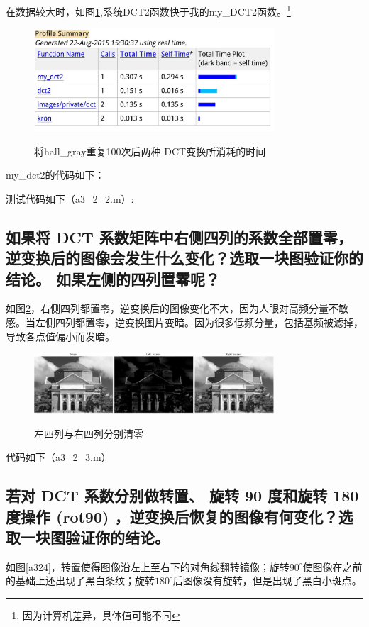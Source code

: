 \documentclass{ctexart}
\begin{document}
在数据较大时，如图\ref{a322},系统DCT2函数快于我的my\_DCT2函数。\footnote{因为计算机差异，具体值可能不同}
\begin{figure}
    \centering
    \includegraphics[width=0.8\textwidth]{a3_2_2.jpg}\\
    \caption{将hall\_gray重复100次后两种
    DCT变换所消耗的时间\label{a322}}
\end{figure}

my\_dct2的代码如下：


测试代码如下（a3\_2\_2.m）:


\subsection{
如果将 DCT 系数矩阵中右侧四列的系数全部置零，逆变换后的图像会发生什么变化？选取一块图验证你的结论。 如果左侧的四列置零呢？
}
如图\ref{a323}，右侧四列都置零，逆变换后的图像变化不大，因为人眼对高频分量不敏感。当左侧四列都置零，逆变换图片变暗。因为很多低频分量，包括基频被滤掉，导致各点值偏小而发暗。
\begin{figure}
    \centering
    \includegraphics[width=0.8\textwidth]{a3_2_3.jpg}\\
    \caption{左四列与右四列分别清零\label{a323}}
\end{figure}

代码如下（a3\_2\_3.m）

\subsection{
若对 DCT 系数分别做转置、 旋转 90 度和旋转 180 度操作 (rot90) ，逆变换后恢复的图像有何变化？选取一块图验证你的结论。}
如图\ref{a324}，转置使得图像沿左上至右下的对角线翻转镜像；旋转$90^{\circ}$使图像在之前的基础上还出现了黑白条纹；旋转$180^{\circ}$后图像没有旋转，但是出现了黑白小斑点。
\end{document}
